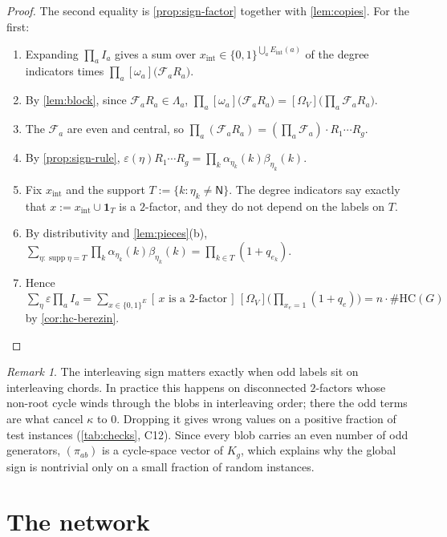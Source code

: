 \documentclass[11pt]{amsart}
\theoremstyle{plain}
\theoremstyle{definition}
\theoremstyle{remark}
\newtheorem{remark}[theorem]{Remark}
\numberwithin{equation}{section}
\newcommand{\HC}{\#\mathrm{HC}}
\newcommand{\cF}{\mathcal{F}}
\newcommand{\topc}[2]{[#1]\bigl(#2\bigr)}
\newcommand{\lab}[1]{\mathsf{#1}}
\newcommand{\Eint}{E_{\mathrm{int}}}
\newcommand{\supp}{\operatorname{supp}}
\newcommand{\Ind}[1]{[\,#1\,]}
\begin{document}
\begin{proof}
The second equality is \cref{prop:sign-factor} together with \cref{lem:copies}. For the first:
\begin{enumerate}[label=(\arabic*)]
\item Expanding $\prod_aI_a$ gives a sum over $x_{\mathrm{int}}\in\{0,1\}^{\bigcup_a\Eint(a)}$ of
the degree indicators times $\prod_a\topc{\omega_a}{\cF_aR_a}$.
\item By \cref{lem:block}, since $\cF_aR_a\in\Lambda_a$,
$\prod_a\topc{\omega_a}{\cF_aR_a}=\topc{\Omega_V}{\prod_a\cF_aR_a}$.
\item The $\cF_a$ are even and central, so $\prod_a(\cF_aR_a)=(\prod_a\cF_a)\cdot R_1\cdots R_g$.
\item By \cref{prop:sign-rule}, $\varepsilon(\eta)R_1\cdots R_g=\prod_k\alpha_{\eta_k}(k)
\beta_{\eta_k}(k)$.
\item Fix $x_{\mathrm{int}}$ and the support $T:=\{k:\eta_k\ne\lab N\}$. The degree indicators say
exactly that $x:=x_{\mathrm{int}}\cup\mathbf 1_T$ is a $2$-factor, and they do not depend on the
labels on $T$.
\item By distributivity and \cref{lem:pieces}(b),
$\sum_{\eta\colon\supp\eta=T}\prod_k\alpha_{\eta_k}(k)\beta_{\eta_k}(k)=\prod_{k\in T}(1+q_{e_k})$.
\item Hence $\sum_\eta\varepsilon\prod_aI_a=\sum_{x\in\{0,1\}^E}\Ind{x\text{ is a $2$-factor}}
\,\topc{\Omega_V}{\prod_{x_e=1}(1+q_e)}=n\cdot\HC(G)$ by \cref{cor:hc-berezin}.\qedhere
\end{enumerate}
\end{proof}

\begin{remark}\label{rem:sign-needed}
The interleaving sign matters exactly when odd labels sit on interleaving chords. In practice
this happens on disconnected $2$-factors whose non-root cycle winds through the blobs in
interleaving order; there the odd terms are what cancel $\kappa$ to $0$. Dropping it gives wrong
values on a positive fraction of test instances (\cref{tab:checks}, C12). Since every blob
carries an even number of odd generators, $(\pi_{ab})$ is a cycle-space vector of $K_g$, which
explains why the global sign is nontrivial only on a small fraction of random instances.
\end{remark}

\section{The network}\label{sec:network}
\end{document}
